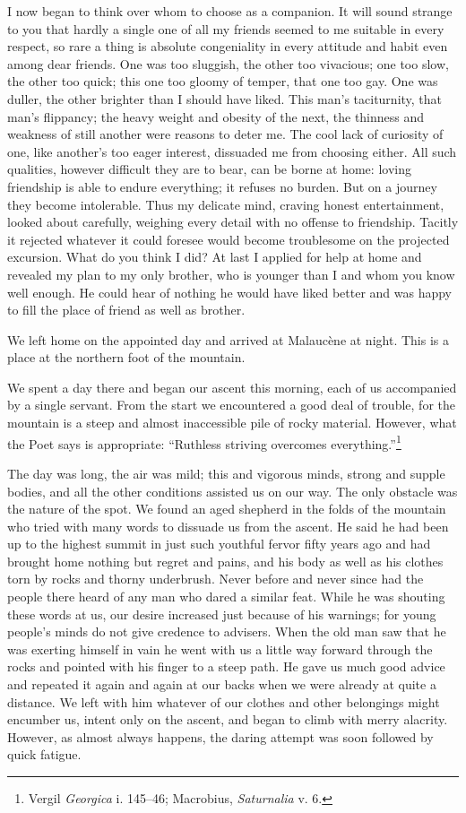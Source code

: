 I now began to think over whom to choose as a companion. It will sound
strange to you that hardly a single one of all my friends seemed to me
suitable in every respect, so rare a thing is absolute congeniality in
every attitude and habit even among dear friends. One was too
sluggish, the other too vivacious; one too slow, the other too quick;
this one too gloomy of temper, that one too gay. One was duller, the
other brighter than I should have liked. This man's taciturnity, that
man's flippancy; the heavy weight and obesity of the next, the
thinness and weakness of still another were reasons to deter me. The
cool lack of curiosity of one, like another's too eager interest,
dissuaded me from choosing either. All such qualities, however
difficult they are to bear, can be borne at home: loving friendship is
able to endure everything; it refuses no burden. But on a journey they
become intolerable. Thus my delicate mind, craving honest
entertainment, looked about carefully, weighing every detail with no
offense to friendship. Tacitly it rejected whatever it could foresee
would become troublesome on the projected excursion.  What do
you think I did? At last I applied for help at home and revealed my
plan to my only brother, who is younger than I and whom you know well
enough. He could hear of nothing he would have liked better and was
happy to fill the place of friend as well as brother.

We left home on the appointed day and arrived at Malauc\`{e}ne at
night. This is a place at the northern foot of the mountain.

We spent a day there and began our ascent this morning, each of us
accompanied by a single servant. From the start we encountered a good
deal of trouble, for the mountain is a steep and almost inaccessible
pile of rocky material. However, what the Poet says is appropriate:
``Ruthless striving overcomes everything.''\footnote{Vergil
\textit{Georgica} i. 145--46; Macrobius, \textit{Saturnalia} v. 6.}

The day was long, the air was mild; this and vigorous minds, strong
and supple bodies, and all the other conditions assisted us on our
way. The only obstacle was the nature of the spot. We found an aged
shepherd in the folds of the mountain who tried with many words to
dissuade us from the ascent. He said he had been up to the highest
summit in just such youthful fervor fifty years ago and had brought
home nothing but regret and pains, and his body as well as his clothes
torn by rocks and thorny underbrush. Never before and never since had
the people there heard of any man who dared a similar feat. While he
was shouting these words at us, our desire increased just because of
his warnings; for young people's minds do not give credence to
advisers. When the old man saw that he was exerting himself in vain he
went with us a little way forward through the rocks and pointed with
his finger to a steep path. He gave us much good advice and repeated
it again and again at our backs when we were already at quite a
distance. We left with him whatever of our clothes and other
belongings might encumber us, intent only on the ascent, and began to
climb with merry alacrity. However, as almost always happens, the
daring attempt was soon followed by quick fatigue.

